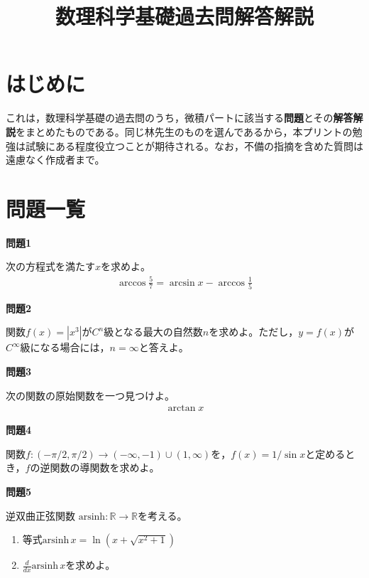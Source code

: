 \documentclass[a4paper,12pt,dvipdfmx,fleqn, oneside]{jsarticle}
\title{数理科学基礎過去問解答解説}
\author{}
\date{}
\theoremstyle{defstyle}
\theoremstyle{thmx}
\theoremstyle{qesstyle}
\begin{document}
\setlength{\abovedisplayskip}{4pt}
\setlength{\belowdisplayskip}{4pt}
\maketitle

\section*{はじめに}
これは，数理科学基礎の過去問のうち，微積パートに該当する\textbf{問題}とその\textbf{解答解説}をまとめたものである。同じ林先生のものを選んであるから，本プリントの勉強は試験にある程度役立つことが期待される。なお，不備の指摘を含めた質問は遠慮なく作成者まで。
\section*{問題一覧}
\begin{shadebox}
    \textbf{問題1}

    次の方程式を満たす$x$を求めよ。
    \begin{align*}
        \arccos \frac{5}{7} = \arcsin x- \arccos \frac{1}{5}
    \end{align*}
\end{shadebox}
\begin{shadebox}
    \textbf{問題2}

    関数$f(x)=\left|x^3\right|$が$C^n$級となる最大の自然数$n$を求めよ。ただし，$y=f(x)$が$C^{\infty}$級になる場合には，$n=\infty$と答えよ。
\end{shadebox}
\begin{shadebox}
    \textbf{問題3}

    次の関数の原始関数を一つ見つけよ。
    \begin{align*}
        \arctan x
    \end{align*}
\end{shadebox}
\begin{shadebox}
    \textbf{問題4}

    関数$f:(-\pi/ 2, \pi / 2) \rightarrow (- \infty , -1) \cup (1, \infty)$を，$f(x)=1/\sin x$と定めるとき，$f$の逆関数の導関数を求めよ。
\end{shadebox}
\begin{shadebox}
    \textbf{問題5}

    逆双曲正弦関数 $\text{arsinh} : \mathbb{R} \rightarrow \mathbb{R}$を考える。
    \begin{enumerate}
        \item 等式$\text{arsinh}\, x = \ln(x+\sqrt{x^2+1})$
        \item $\frac{d}{dx} \text{arsinh} \, x$を求めよ。
    \end{enumerate}
\end{shadebox}
\end{document}

